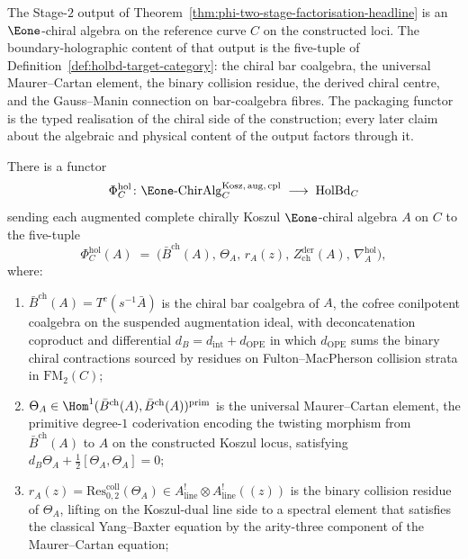 The Stage-$2$ output of Theorem~\ref{thm:phi-two-stage-factorisation-headline} is an $\Eone$-chiral algebra on the reference curve $C$ on the constructed loci. The boundary-holographic content of that output is the five-tuple of Definition~\ref{def:holbd-target-category}: the chiral bar coalgebra, the universal Maurer--Cartan element, the binary collision residue, the derived chiral centre, and the Gauss--Manin connection on bar-coalgebra fibres. The packaging functor is the typed realisation of the chiral side of the construction; every later claim about the algebraic and physical content of the output factors through it.

\begin{theorem}
\label{thm:typed-boundary-holographic-realisation}
There is a functor
\[
 \Phi^{\mathrm{hol}}_C \colon
 \Eone\text{-}\mathrm{ChirAlg}_C^{\mathrm{Kosz},\, \mathrm{aug},\, \mathrm{cpl}}
 \;\longrightarrow\;
 \mathrm{HolBd}_C
\]
sending each augmented complete chirally Koszul $\Eone$-chiral algebra $A$ on $C$ to the five-tuple
\[
 \Phi^{\mathrm{hol}}_C(A)
 \;=\;
 \bigl(\bar B^{\mathrm{ch}}(A),\, \Theta_A,\, r_A(z),\, Z^{\mathrm{der}}_{\mathrm{ch}}(A),\, \nabla_A^{\mathrm{hol}}\bigr),
\]
where:
\begin{enumerate}[label=\textup{(\roman*)}]
 \item $\bar B^{\mathrm{ch}}(A) = T^c(s^{-1} \bar A)$ is the chiral bar coalgebra of $A$, the cofree conilpotent coalgebra on the suspended augmentation ideal, with deconcatenation coproduct and differential $d_B = d_{\mathrm{int}} + d_{\mathrm{OPE}}$ in which $d_{\mathrm{OPE}}$ sums the binary chiral contractions sourced by residues on Fulton--MacPherson collision strata in $\mathrm{FM}_2(C)$;
 \item $\Theta_A \in \Hom^1(\bar B^{\mathrm{ch}}(A), \bar B^{\mathrm{ch}}(A))^{\mathrm{prim}}$ is the universal Maurer--Cartan element, the primitive degree-$1$ coderivation encoding the twisting morphism from $\bar B^{\mathrm{ch}}(A)$ to $A$ on the constructed Koszul locus, satisfying $d_B \Theta_A + \tfrac{1}{2}[\Theta_A, \Theta_A] = 0$;
 \item $r_A(z) = \mathrm{Res}^{\mathrm{coll}}_{0, 2}(\Theta_A) \in A^!_{\mathrm{line}} \otimes A^!_{\mathrm{line}}((z))$ is the binary collision residue of $\Theta_A$, lifting on the Koszul-dual line side to a spectral element that satisfies the classical Yang--Baxter equation by the arity-three component of the Maurer--Cartan equation;

\end{enumerate}
\end{theorem}
